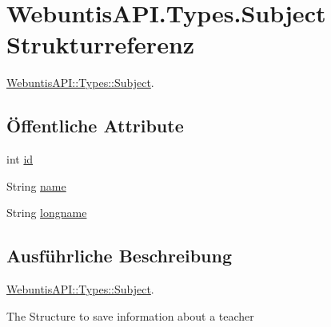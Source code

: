 \hypertarget{struct_webuntis_a_p_i_1_1_types_1_1_subject}{\section{Webuntis\-A\-P\-I.\-Types.\-Subject Strukturreferenz}
\label{struct_webuntis_a_p_i_1_1_types_1_1_subject}
}


\hyperlink{struct_webuntis_a_p_i_1_1_types_1_1_subject}{Webuntis\-A\-P\-I\-::\-Types\-::\-Subject}.  


\subsection*{Öffentliche Attribute}
\begin{DoxyCompactItemize}
\item 
int \hyperlink{struct_webuntis_a_p_i_1_1_types_1_1_subject_ae9e339f8fc82608d03dcd222fc03e81a}{id}
\item 
String \hyperlink{struct_webuntis_a_p_i_1_1_types_1_1_subject_a52c74e223123db5b7add56d0a6ad0708}{name}
\item 
String \hyperlink{struct_webuntis_a_p_i_1_1_types_1_1_subject_a07f2f0280c83cc595fcd18f8c291d9a0}{longname}
\end{DoxyCompactItemize}


\subsection{Ausführliche Beschreibung}
\hyperlink{struct_webuntis_a_p_i_1_1_types_1_1_subject}{Webuntis\-A\-P\-I\-::\-Types\-::\-Subject}. 

The Structure to save information about a teacher 

